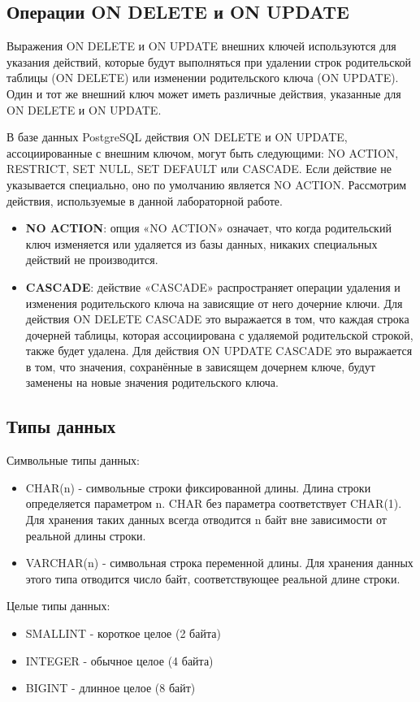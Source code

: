 \subsection{Операции ON DELETE и ON UPDATE}
Выражения ON DELETE и ON UPDATE внешних ключей используются для указания действий, которые будут выполняться при удалении строк родительской таблицы (ON DELETE) или изменении родительского ключа (ON UPDATE). Один и тот же внешний ключ может иметь различные действия, указанные для ON DELETE и ON UPDATE.

В базе данных PostgreSQL действия ON DELETE и ON UPDATE, ассоциированные с внешним ключом, могут быть следующими: NO ACTION, RESTRICT, SET NULL, SET DEFAULT или CASCADE. Если действие не указывается специально, оно по умолчанию является NO ACTION.
Рассмотрим действия, используемые в данной лабораторной работе.

\begin{itemize}
	\item \textbf{NO ACTION}: опция «NO ACTION» означает, что когда родительский ключ изменяется или удаляется из базы данных, никаких специальных действий не производится.
	\item \textbf{CASCADE}: действие «CASCADE» распространяет операции удаления и изменения родительского ключа на зависящие от него дочерние ключи. Для действия ON DELETE CASCADE это выражается в том, что каждая строка дочерней таблицы, которая ассоциирована с удаляемой родительской строкой, также будет удалена. Для действия ON UPDATE CASCADE это выражается в том, что значения, сохранённые в зависящем дочернем ключе, будут заменены на новые значения родительского ключа.
\end{itemize}

\subsection{Типы данных}
Символьные типы данных:
\begin {itemize}
	\item CHAR(n) - символьные строки фиксированной длины. Длина строки определяется параметром n. CHAR без параметра соответствует CHAR(1). Для хранения таких данных всегда отводится n байт вне зависимости от реальной длины строки.
	\item VARCHAR(n) - символьная строка переменной длины. Для хранения данных этого типа отводится число байт, соответствующее реальной длине строки.
\end {itemize}

Целые типы данных:
\begin {itemize}
	\item SMALLINT - короткое целое (2 байта)
	\item INTEGER - обычное целое (4 байта) 
	\item BIGINT - длинное целое (8 байт) 
\end {itemize}

